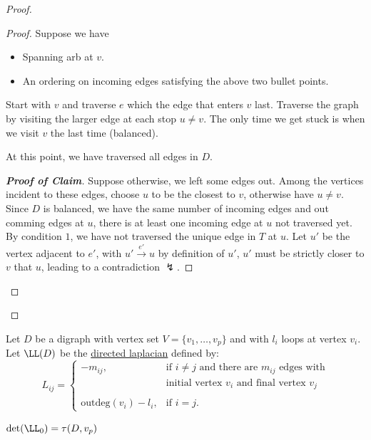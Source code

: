 \begin{proof}
	\begin{proof}
		Suppose we have
		\begin{itemize}
			\item Spanning arb at \( v \).
			\item An ordering on incoming edges satisfying the above two bullet points.
		\end{itemize}
		Start with \( v \) and traverse \( e \) which the edge that enters \( v \) last. Traverse the
		graph by visiting the larger edge at each stop \( u\ne v \). The only time we get stuck is when
		we visit \( v \) the last time (balanced).
		\begin{claim}
			At this point, we have traversed all edges in \( D \).
		\end{claim}
		\begin{proof}[\textbf{Proof of Claim}]
			Suppose otherwise, we left some edges out. Among the vertices incident to these edges, choose
			\( u \) to be the closest to \( v \), otherwise have \( u\ne v \). Since \( D \) is balanced,
			we have the same number of incoming edges and out comming edges at \( u \), there is at least
			one incoming edge at \( u \) not traversed yet. By condition \( 1 \), we have not traversed
			the unique edge in \( T \) at \( u \). Let \( u' \) be the vertex adjacent to \( e' \), with
			\( u' \xrightarrow{e'} u \) by definition of \( u' \), \( u' \) must be strictly closer to \(
			v\) that \( u \), leading to a contradiction $\lightning$.
		\end{proof}
	\end{proof}
\end{proof}

\begin{definition}
	Let \( D \) be a digraph with vertex set \( V = \{v_1,\ldots, v_p\} \) and with \( l_i \)
	loops at vertex \( v_i \). Let \( \LL(D) \) be the \underline{directed laplacian} defined by:
	$$
		L_{ij} = \begin{cases}
			-m_{ij},                  & \text{if } i \neq j \text{ and there are } m_{ij} \text{ edges with} \\
			                          & \text{initial vertex } v_i \text{ and final vertex } v_j             \\ \\
			\text{outdeg}(v_i) - l_i, & \text{if } i = j.
		\end{cases}
	$$
\end{definition}

\begin{theorem}
	\( \det(\LL_{0}) = \tau(D,v_p)\)
\end{theorem}

